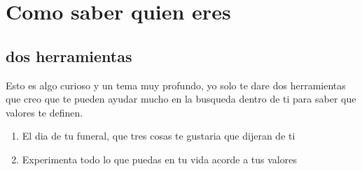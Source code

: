 \chapter{Como saber quien eres}
\section{dos herramientas}
Esto es algo curioso y un tema muy profundo, yo solo te dare dos herramientas que creo que te pueden ayudar mucho en la busqueda dentro de ti para saber que valores te definen.
\begin{enumerate}
	\item El dia de tu funeral, que tres cosas te gustaria que dijeran de ti
	\item Experimenta todo lo que puedas en tu vida acorde a tus valores
\end{enumerate}
